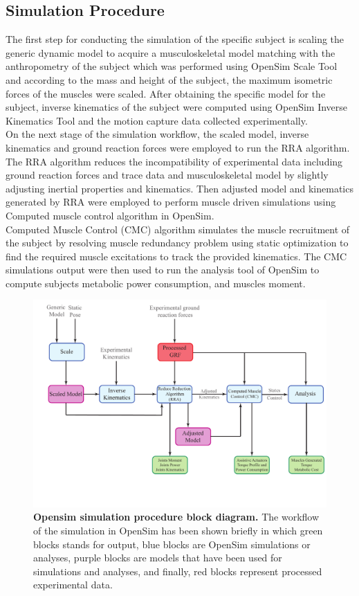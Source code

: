 \documentclass[10pt,letterpaper]{article}
\begin{document}
\subsection*{Simulation Procedure}
The first step for conducting the simulation of the specific subject is scaling the generic dynamic model to acquire a musculoskeletal model matching with the anthropometry of the subject which was performed using OpenSim Scale Tool and according to the mass and height of the subject, the maximum isometric forces of the muscles were scaled. After obtaining the specific model for the subject, inverse kinematics of the subject were computed using OpenSim Inverse Kinematics Tool and the motion capture data collected experimentally.\\
On the next stage of the simulation workflow, the scaled model, inverse kinematics and ground reaction forces were employed to run the RRA algorithm\cite{103}. The RRA algorithm reduces the incompatibility of experimental data including ground reaction forces and trace data and musculoskeletal model by slightly adjusting inertial properties and kinematics. Then adjusted model and kinematics generated by RRA were employed to perform muscle driven simulations using Computed muscle control algorithm in OpenSim\cite{104}.\\
Computed Muscle Control (CMC) algorithm simulates the muscle recruitment of the subject by resolving muscle redundancy problem using static optimization to find the required muscle excitations to track the provided kinematics. The CMC simulations output were then used to run the analysis tool of OpenSim to compute subjects metabolic power consumption, and muscles moment.\\
\begin{figure}[ht]
	\includegraphics[width=\linewidth]{Cartoons/OpenSim.pdf} 
	\vspace{-5mm}
	\caption{\small{\textbf{Opensim simulation procedure block diagram.} The workflow of the simulation in OpenSim has been shown briefly in which green blocks stands for output, blue blocks are OpenSim simulations or analyses, purple blocks are models that have been used for simulations and analyses, and finally, red blocks represent processed experimental data.}}
	\label{Fig_OpenSim_Sim_Procedure}
\end{figure}
\end{document}
